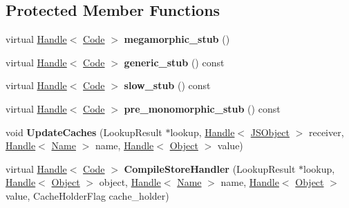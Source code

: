 \subsection*{Protected Member Functions}
\begin{DoxyCompactItemize}
\item 
\hypertarget{classv8_1_1internal_1_1_store_i_c_a552a4605442ef9e6b92b7fc2a9642ed3}{}virtual \hyperlink{classv8_1_1internal_1_1_handle}{Handle}$<$ \hyperlink{classv8_1_1internal_1_1_code}{Code} $>$ {\bfseries megamorphic\+\_\+stub} ()\label{classv8_1_1internal_1_1_store_i_c_a552a4605442ef9e6b92b7fc2a9642ed3}

\item 
\hypertarget{classv8_1_1internal_1_1_store_i_c_a11b9be2e5946bcbb9ad50b3b0731a587}{}virtual \hyperlink{classv8_1_1internal_1_1_handle}{Handle}$<$ \hyperlink{classv8_1_1internal_1_1_code}{Code} $>$ {\bfseries generic\+\_\+stub} () const \label{classv8_1_1internal_1_1_store_i_c_a11b9be2e5946bcbb9ad50b3b0731a587}

\item 
\hypertarget{classv8_1_1internal_1_1_store_i_c_a9102bca4134013ca5276f7e843b3d792}{}virtual \hyperlink{classv8_1_1internal_1_1_handle}{Handle}$<$ \hyperlink{classv8_1_1internal_1_1_code}{Code} $>$ {\bfseries slow\+\_\+stub} () const \label{classv8_1_1internal_1_1_store_i_c_a9102bca4134013ca5276f7e843b3d792}

\item 
\hypertarget{classv8_1_1internal_1_1_store_i_c_ad67321a9a0ec74d598b638c4326c6bce}{}virtual \hyperlink{classv8_1_1internal_1_1_handle}{Handle}$<$ \hyperlink{classv8_1_1internal_1_1_code}{Code} $>$ {\bfseries pre\+\_\+monomorphic\+\_\+stub} () const \label{classv8_1_1internal_1_1_store_i_c_ad67321a9a0ec74d598b638c4326c6bce}

\item 
\hypertarget{classv8_1_1internal_1_1_store_i_c_a2d024ca4468d6ac43a313677b81e42fb}{}void {\bfseries Update\+Caches} (Lookup\+Result $\ast$lookup, \hyperlink{classv8_1_1internal_1_1_handle}{Handle}$<$ \hyperlink{classv8_1_1internal_1_1_j_s_object}{J\+S\+Object} $>$ receiver, \hyperlink{classv8_1_1internal_1_1_handle}{Handle}$<$ \hyperlink{classv8_1_1internal_1_1_name}{Name} $>$ name, \hyperlink{classv8_1_1internal_1_1_handle}{Handle}$<$ \hyperlink{classv8_1_1internal_1_1_object}{Object} $>$ value)\label{classv8_1_1internal_1_1_store_i_c_a2d024ca4468d6ac43a313677b81e42fb}

\item 
\hypertarget{classv8_1_1internal_1_1_store_i_c_af107a7ccbc34a9ae08a471ad5319023d}{}virtual \hyperlink{classv8_1_1internal_1_1_handle}{Handle}$<$ \hyperlink{classv8_1_1internal_1_1_code}{Code} $>$ {\bfseries Compile\+Store\+Handler} (Lookup\+Result $\ast$lookup, \hyperlink{classv8_1_1internal_1_1_handle}{Handle}$<$ \hyperlink{classv8_1_1internal_1_1_object}{Object} $>$ object, \hyperlink{classv8_1_1internal_1_1_handle}{Handle}$<$ \hyperlink{classv8_1_1internal_1_1_name}{Name} $>$ name, \hyperlink{classv8_1_1internal_1_1_handle}{Handle}$<$ \hyperlink{classv8_1_1internal_1_1_object}{Object} $>$ value, Cache\+Holder\+Flag cache\+\_\+holder)\label{classv8_1_1internal_1_1_store_i_c_af107a7ccbc34a9ae08a471ad5319023d}


\end{DoxyCompactItemize}
